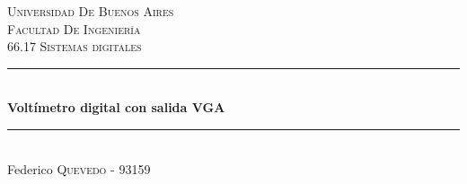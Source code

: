\documentclass{article}
\begin{document}
\begin{titlepage}

\newcommand{\HRule}{\rule{\linewidth}{0.5mm}} %

\center %
 

\textsc{\LARGE Universidad De Buenos Aires}\\[1.5cm] %
\textsc{\Large Facultad De Ingeniería}\\[0.5cm] %
\textsc{\large 66.17 Sistemas digitales}\\[0.5cm] %


\HRule \\[0.4cm]
{ \huge \bfseries Voltímetro digital con salida VGA}\\[0.4cm] %
\HRule \\[1.5cm]
 

\Large Federico \textsc{Quevedo} - 93159\\ %
[5cm] %



\end{titlepage}
\end{document}
